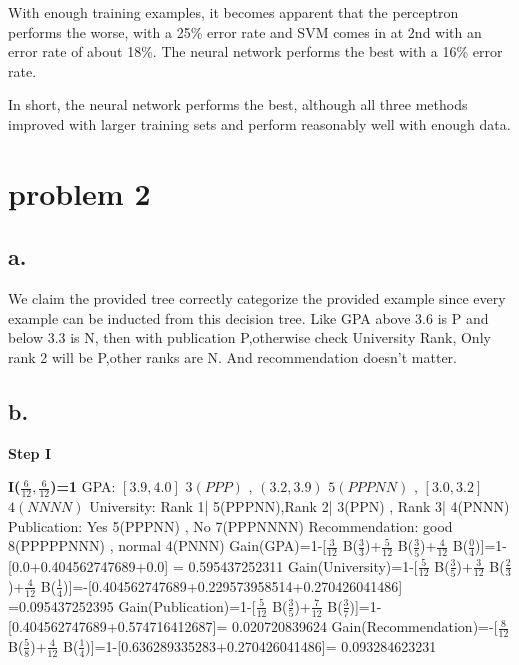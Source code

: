 \documentclass[12pt, letterpaper]{article}
\begin{document}
	With enough training examples, it becomes apparent that the perceptron performs the worse, with a 25\% error rate and SVM comes in at 2nd with an error rate of about 18\%. The neural network performs the best with a 16\% error rate.
	
	In short, the neural network performs the best, although all three methods improved with larger training sets and perform reasonably well with enough data.
	
	\pagebreak
	\section{problem 2}
	\subsection{a.}
	
	We claim the provided tree correctly categorize the provided example since every example can be inducted from this decision tree.
	Like GPA above 3.6 is P and below 3.3 is N, then with publication P,otherwise check University Rank, Only rank 2 will be P,other ranks are N. And recommendation doesn't matter.
	
	\subsection{b.}\large
	\textbf{Step I}
	
	\textbf{I($\frac{6}{12},\frac{6}{12}$)=1}\newline
	GPA: $[3.9,4.0]$ $3(PPP)$ , $(3.2,3.9)$ $5(PPPNN)$ , $[3.0,3.2]$ $4(NNNN)$\newline
	University: Rank 1| 5(PPPNN),Rank 2| 3(PPN) , Rank 3| 4(PNNN)\newline
	Publication: Yes 5(PPPNN) , No 7(PPPNNNN)\newline
	Recommendation: good 8(PPPPPNNN) , normal 4(PNNN)\newline\newline
	Gain(GPA)=1-[$\frac{3}{12}$ B($\frac{3}{3}$)+$\frac{5}{12}$ B($\frac{3}{5}$)+$\frac{4}{12}$ B($\frac{0}{4}$)]=1-[0.0+0.404562747689+0.0]
	= 0.595437252311\newline\newline
	Gain(University)=1-[$\frac{5}{12}$ B($\frac{3}{5}$)+$\frac{3}{12}$ B($\frac{2}{3}$)+$\frac{4}{12}$ B($\frac{1}{4}$)]=-[0.404562747689+0.229573958514+0.270426041486] =0.095437252395\newline\newline
	Gain(Publication)=1-[$\frac{5}{12}$ B($\frac{3}{5}$)+$\frac{7}{12}$ B($\frac{3}{7}$)]=1-[0.404562747689+0.574716412687]= 0.020720839624\newline\newline
	Gain(Recommendation)=-[$\frac{8}{12}$ B($\frac{5}{8}$)+$\frac{4}{12}$ B($\frac{1}{4}$)]=1-[0.636289335283+0.270426041486]= 0.093284623231\newline
	
\end{document}
